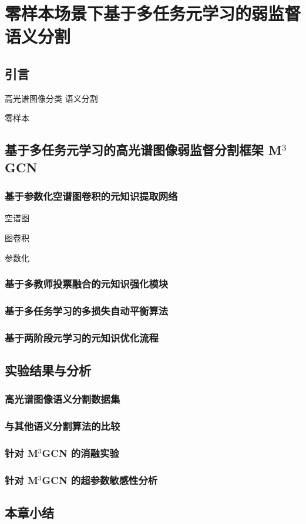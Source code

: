 \chapter{零样本场景下基于多任务元学习的弱监督语义分割}
\section{引言}
高光谱图像分类 \rightarrow 语义分割
\par
零样本
\section{基于多任务元学习的高光谱图像弱监督分割框架 M$^3$GCN}
\subsection{基于参数化空谱图卷积的元知识提取网络}
空谱图
\par
图卷积
\par
参数化
\subsection{基于多教师投票融合的元知识强化模块}
\subsection{基于多任务学习的多损失自动平衡算法}
\subsection{基于两阶段元学习的元知识优化流程}
\section{实验结果与分析}
\subsection{高光谱图像语义分割数据集}
\subsection{与其他语义分割算法的比较}
\subsection{针对 M$^3$GCN 的消融实验}
\subsection{针对 M$^3$GCN 的超参数敏感性分析}
\section{本章小结}
